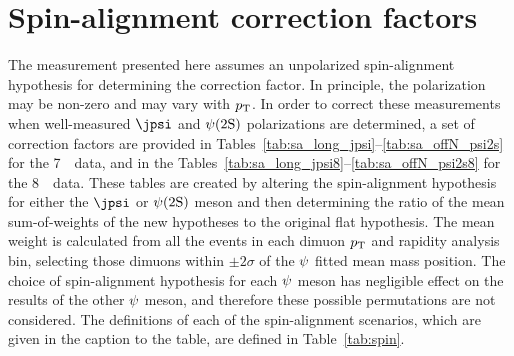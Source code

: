 \FloatBarrier
\section{Spin-alignment correction factors}
\label{sec:spincorrection}

The measurement presented here assumes an unpolarized spin-alignment hypothesis for determining the correction factor. In principle, the polarization may be non-zero and may vary with $\mbox{$p_{\text{T}}$}$.
In order to correct these measurements when well-measured $\jpsi$ and $\psi(2\mathrm{S})$ polarizations are determined, a set of correction factors are provided 
in Tables~\ref{tab:sa_long_jpsi}--\ref{tab:sa_offN_psi2s} for the 7~\TeV\ data, and in the Tables~\ref{tab:sa_long_jpsi8}--\ref{tab:sa_offN_psi2s8} for the 8~\TeV\ data.
These tables are created by altering the spin-alignment hypothesis for either the $\jpsi$ or $\psi(2\mathrm{S})$ meson and then determining the ratio of the mean sum-of-weights of the new hypotheses to the original flat hypothesis.
The mean weight is calculated from all the events in each dimuon $\mbox{$p_{\text{T}}$}$ and rapidity analysis bin, selecting those dimuons within $\pm2\sigma$ of the $\psi$ fitted mean mass position.
The choice of spin-alignment hypothesis for each $\psi$ meson has negligible effect on the results of the other $\psi$ meson, and therefore these possible permutations are not considered.
The definitions of each of the spin-alignment scenarios, which are given in the caption to the table, are defined in Table~\ref{tab:spin}.


